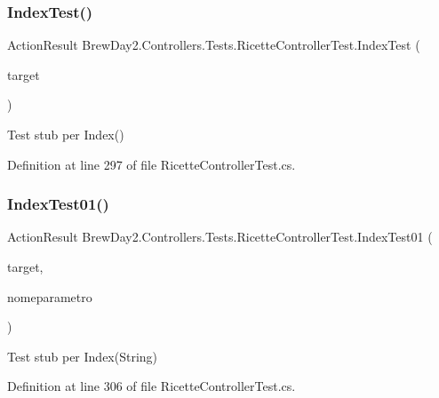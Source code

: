 \subsubsection{\texorpdfstring{Index\+Test()}{IndexTest()}}
{\footnotesize\ttfamily Action\+Result Brew\+Day2.\+Controllers.\+Tests.\+Ricette\+Controller\+Test.\+Index\+Test (\begin{DoxyParamCaption}\item[{\mbox{[}\+Pex\+Assume\+Under\+Test\mbox{]} \mbox{\hyperlink{class_brew_day2_1_1_controllers_1_1_ricette_controller}{Ricette\+Controller}}}]{target }\end{DoxyParamCaption})}



Test stub per Index()



Definition at line 297 of file Ricette\+Controller\+Test.\+cs.

\mbox{\label{class_brew_day2_1_1_controllers_1_1_tests_1_1_ricette_controller_test_a09e63eb91bb93131e735af7630c82010}} 
\subsubsection{\texorpdfstring{Index\+Test01()}{IndexTest01()}}
{\footnotesize\ttfamily Action\+Result Brew\+Day2.\+Controllers.\+Tests.\+Ricette\+Controller\+Test.\+Index\+Test01 (\begin{DoxyParamCaption}\item[{\mbox{[}\+Pex\+Assume\+Under\+Test\mbox{]} \mbox{\hyperlink{class_brew_day2_1_1_controllers_1_1_ricette_controller}{Ricette\+Controller}}}]{target,  }\item[{string}]{nomeparametro }\end{DoxyParamCaption})}



Test stub per Index(\+String)



Definition at line 306 of file Ricette\+Controller\+Test.\+cs.

\mbox{\label{class_brew_day2_1_1_controllers_1_1_tests_1_1_ricette_controller_test_ad2b50dda16a27ee89966b7b5fafc929e}} 
